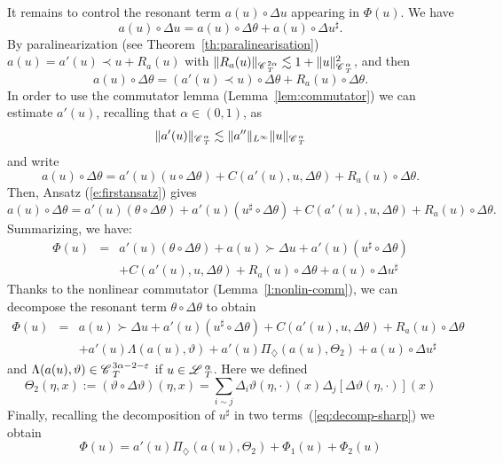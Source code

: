 \documentclass{amsart}
\newcommand{\assign}{:=}
\newcommand{\cdummy}{\cdot}
\theoremstyle{remark}
\theoremstyle{definition}
\newcommand{\CC}{\mathscr{C} \hspace{.1em}}
\newcommand{\LL}{\mathscr{L} \hspace{.2em}}
\begin{document}
It remains to control the resonant term $a (u) \circ \Delta u$ appearing in
$\Phi (u)$. We have
\[ a (u) \circ \Delta u = a (u) \circ \Delta \theta + a (u) \circ \Delta
   u^{\sharp} . \]
By paralinearization (see Theorem~\ref{th:paralinearisation}) $a (u) = a' (u)
\prec u + R_a (u)$ with $\| R_a (u) \|_{\CC^{2 \alpha}_T} \lesssim 1 + \| u
\|^2_{\CC^{\alpha}_T}$, and then
\[ a (u) \circ \Delta \theta = (a' (u) \prec u) \circ \Delta \theta + R_a (u)
   \circ \Delta \theta . \]
In order to use the commutator lemma (Lemma~\ref{lem:commutator}) we can
estimate $a' (u)$, recalling that $\alpha \in (0, 1)$, as
\[ \| a' (u) \|_{\CC^{\alpha}_T} \lesssim \| a'' \|_{L^{\infty}} \| u
   \|_{\CC^{\alpha}_T} \]
and write
\[ a (u) \circ \Delta \theta = a' (u) (u \circ \Delta \theta) + C (a' (u), u,
   \Delta \theta) + R_a (u) \circ \Delta \theta . \]
Then, Ansatz (\ref{e:firstansatz}) gives
\[ a (u) \circ \Delta \theta = a' (u) (\theta \circ \Delta \theta) + a' (u)
   (u^{\sharp} \circ \Delta \theta) + C (a' (u), u, \Delta \theta) + R_a (u)
   \circ \Delta \theta . \]
Summarizing, we have:
\begin{eqnarray*}
  \Phi (u) & = & a' (u) (\theta \circ \Delta \theta) + a (u) \succ \Delta u +
  a' (u) (u^{\sharp} \circ \Delta \theta)\\
  &  & + C (a' (u), u, \Delta \theta) + R_a (u) \circ \Delta \theta + a (u)
  \circ \Delta u^{\sharp}
\end{eqnarray*}
Thanks to the nonlinear commutator (Lemma~\ref{l:nonlin-comm}), we can
decompose the resonant term $\theta \circ \Delta \theta$ to obtain
\begin{eqnarray*}
  \Phi (u) & = & a (u) \succ \Delta u + a' (u) (u^{\sharp} \circ \Delta
  \theta) + C (a' (u), u, \Delta \theta) + R_a (u) \circ \Delta \theta\\
  &  & + a' (u) \Lambda (a (u), \vartheta) + a' (u) \Pi_{\diamondsuit} (a
  (u), \Theta_2) + a (u) \circ \Delta u^{\sharp}
\end{eqnarray*}
and $\Lambda (a (u), \vartheta) \in \CC^{3 \alpha - 2 - \varepsilon}_T$ if $u
\in \LL^{\alpha}_T$. Here we defined
\begin{equation}
  \Theta_2 (\eta, x) \assign (\vartheta \circ \Delta \vartheta) (\eta, x) =
  \sum_{i \sim j} \Delta_i \vartheta (\eta, \cdummy) (x) \Delta_j [\Delta
  \vartheta (\eta, \cdummy)] (x) \label{e:def-Theta}
\end{equation}
Finally, recalling the decomposition of $u^{\sharp}$ in two
terms~(\ref{eq:decomp-sharp}) we obtain
\[ \Phi (u) = a' (u) \Pi_{\diamondsuit} (a (u), \Theta_2) + \Phi_1 (u) +
   \Phi_2 (u) \]
\end{document}
